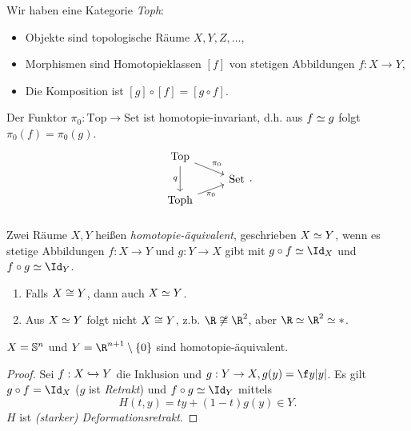 \begin{kor}
	Wir haben eine Kategorie \emph{Toph}:
	\begin{itemize}
		\item
			Objekte sind topologische Räume $X, Y, Z, \dotsc $,
		\item
			Morphismen sind Homotopieklassen $[f]$ von stetigen Abbildungen $f: X \to Y$,
		\item
			Die Komposition ist $[g] \circ [f] = [g\circ f]$.
	\end{itemize}
\end{kor}

\begin{st}
	Der Funktor $\pi_0: \mathrm{Top} \to \mathrm{Set}$ ist homotopie-invariant, d.h. aus $f \homotopic g$ folgt $\pi_0(f) = \pi_0(g)$.
	\[
		\begin{tikzcd}[row sep=tiny]
			\mathrm{Top} \arrow{dr}{\pi_0} \arrow{dd}[left]{q} & \\
			& \mathrm{Set} \\
			\mathrm{Toph} \arrow{ur}[below]{\pi_0} & \\
		\end{tikzcd}.
	\]
\end{st}

\begin{df}
	Zwei Räume $X, Y$ heißen \emph{homotopie-äquivalent}, geschrieben $X \homotopic Y$, wenn es stetige Abbildungen $f: X \to Y$ und $g: Y \to X$ gibt mit $g \circ f \homotopic \Id_X$ und $f \circ g \homotopic \Id_Y$.
\end{df}

\begin{ex}
	\begin{enumerate}[1)]
		\item
			Falls $X \homeomorphic Y$, dann auch $X \homotopic Y$.
		\item
			Aus $X \homotopic Y$ folgt nicht $X \homeomorphic Y$, z.b. $\R \not \homeomorphic \R^2$, aber $\R \homotopic \R^2 \homotopic \ast$.
	\end{enumerate}
\end{ex}

\begin{ex}
	$X = \S^n$ und $Y = \R^{n+1} \setminus \{0\}$ sind homotopie-äquivalent.
	\begin{proof}
		Sei $f: X \injto Y$ die Inklusion und $g: Y \to X, g(y) = \f y{|y|}$.
		Es gilt $g \circ f = \Id_X$ ($g$ ist \emph{Retrakt}) und $f \circ g \homotopic \Id_Y$ mittels
		\[
			H(t,y) = ty + (1-t) g(y) \in Y.
		\]
		$H$ ist \emph{(starker) Deformationsretrakt}.
	\end{proof}
\end{ex}



